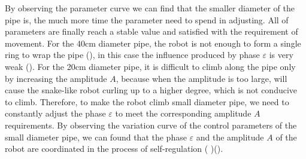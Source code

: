By observing the parameter curve we can find that the smaller diameter of the pipe is, the much more time the parameter need to spend in adjusting. All of parameters are finally reach a stable value and satisfied with the requirement of movement. For the 40cm diameter pipe, the robot is not enough to form a single ring to wrap the pipe (), in this case the influence produced by phase $\varepsilon$ is very weak (). For the 20cm diameter pipe, it is difficult to climb along the pipe only by increasing the amplitude $A$, because when the amplitude is too large, will cause the snake-like robot curling up to a higher degree, which is not conducive to climb. Therefore, to make the robot climb small diameter pipe, we need to constantly adjust the phase $\varepsilon$ to meet the corresponding amplitude $A$ requirements. By observing the variation curve of the control parameters of the small diameter pipe, we can found that the phase $\varepsilon$ and the amplitude $A$ of the robot are coordinated in the process of self-regulation ( )().


